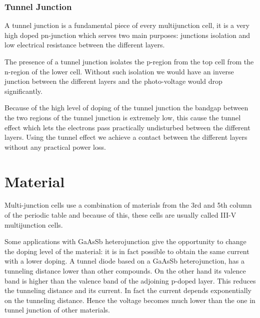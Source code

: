 \documentclass[11pt]{article} %
\begin{document}
\subsubsection{Tunnel Junction}

A tunnel junction is a fundamental piece of every multijunction cell, it is a very high doped pn-junction which serves two main purposes: junctions isolation and low electrical resistance between the different layers.  


The presence of a tunnel junction isolates the p-region from the top cell from the n-region of the lower cell.  Without such isolation we would have an inverse junction between the different layers and the photo-voltage would drop significantly.  


Because of the high level of doping of the tunnel junction the bandgap between the two regions of the tunnel junction is extremely low, this cause the tunnel effect which lets the electrons pass practically undisturbed between the different layers.  Using the tunnel effect we achieve a contact between the different layers without any practical power loss.


\section{Material}

Multi-junction cells use a combination of materials from the 3rd  and 5th column of the periodic table and because of this, these cells are usually called III-V multijunction cells.

Some applications with GaAsSb heterojunction give the opportunity to change the doping level of the material: it is in fact possible to obtain the same current with a lower doping. A tunnel diode based on a GaAsSb heterojunction, has a tunneling distance lower than other compounds. On the other hand its valence band is higher than the valence band of the adjoining p-doped layer. This reduces the tunneling distance and its current. In fact the current depends exponentially on the tunneling distance. Hence the voltage becomes much lower than the one in tunnel junction of other materials.  
\end{document}
